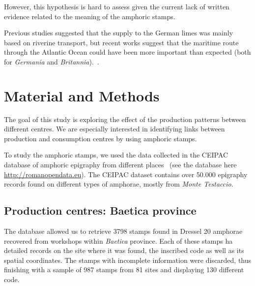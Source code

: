 \documentclass[review]{elsarticle}
\newcommand{\memo}[2]{\textcolor{#1}{#2}}
\newcommand{\xavi}[1]{\memo{magenta}{XRC: #1\\}}
\begin{document}
However, this hypothesis is hard to assess given the current lack of written evidence related to the meaning of the amphoric stamps. 

Previous studies suggested that the supply to the German limes was mainly based on riverine transport, but recent works suggest that the maritime route through the Atlantic Ocean could have been more important than expected (both for \textit{Germania} and \textit{Britannia}).~\citep{remesal_germn_2010,rubio-campillo_ecology_2018}.


\section{Material and Methods}

The goal of this study is exploring the effect of the production patterns between different centres. We are especially interested in identifying links between production and consumption centres by using amphoric stamps. 

To study the amphoric stamps, we used the data collected in the CEIPAC database of amphoric epigraphy from different places~\citep{remesal_centro_2015} (see the database here \url{http://romanopendata.eu}). The CEIPAC dataset contains over 50.000 epigraphy records found on different types of amphorae, mostly from \textit{Monte Testaccio}. 





\subsection{Production centres: Baetica province}


The database allowed us to retrieve 3798 stamps found in Dressel 20 amphorae recovered from workshops within \textit{Baetica} province. Each of these stamps ha detailed records on the site where it was found, the inscribed code as well as its spatial coordinates. The stamps with incomplete information were discarded, thus finishing with a sample of 987 stamps from 81 sites and displaying 130 different code.
\end{document}
